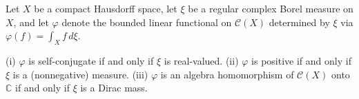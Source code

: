 Let $X$ be a compact Hausdorff space, let $\xi$ be a regular complex Borel measure on $X$, and let $\varphi$ denote the bounded linear functional on $\mathcal{C}(X)$ determined by $\xi$ via $\varphi(f) = \int_X f \, d\xi$.

(i) $\varphi$ is self-conjugate if and only if $\xi$ is real-valued.
(ii) $\varphi$ is positive if and only if $\xi$ is a (nonnegative) measure.
(iii) $\varphi$ is an algebra homomorphism of $\mathcal{C}(X)$ onto $\mathbb{C}$ if and only if $\xi$ is a Dirac mass.

